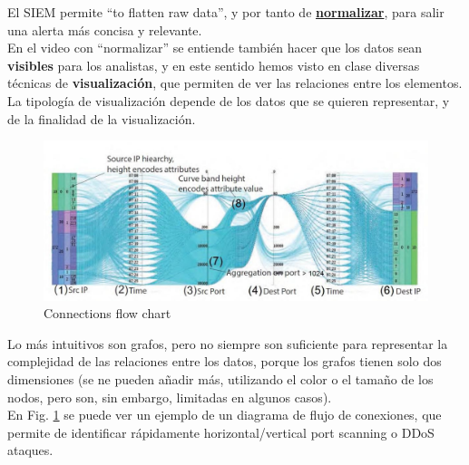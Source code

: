 El \textsc{SIEM} permite ``to flatten raw data'', y por tanto de \ul{\textbf{normalizar}}, para salir una alerta más concisa y relevante.\\
En el video con ``normalizar'' se entiende también hacer que los datos sean \textbf{visibles} para los analistas, y en este sentido hemos visto en clase diversas técnicas de \textbf{visualización}, que permiten de ver las relaciones entre los elementos.\\
La tipología de visualización depende de los datos que se quieren representar, y de la finalidad de la visualización.
\begin{paracol}{2}
   

   \begin{figure}[htbp]
      \centering
      \includegraphics[width=0.75\columnwidth]{images/chart.png}
      \caption{Connections flow chart}
      \label{fig:chart}
   \end{figure}

   \switchcolumn
   \colfill
   Lo más intuitivos son grafos, pero no siempre son suficiente para representar la complejidad de las relaciones entre los datos, porque los grafos tienen solo dos dimensiones (se ne pueden añadir más, utilizando el color o el tamaño de los nodos, pero son, sin embargo, limitadas en algunos casos).\\
   En Fig. \ref{fig:chart} se puede ver un ejemplo de un diagrama de flujo de conexiones, que permite de identificar rápidamente horizontal/vertical port scanning o DDoS ataques.
   \colfill
\end{paracol}

\newpage
